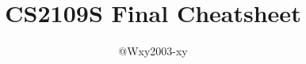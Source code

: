 \documentclass[8pt,twocolumn]{article}
\begin{document}
\makeatletter
\renewcommand\maketitle{%
  \twocolumn[%
    \begin{center}
      \begin{minipage}{0.6\textwidth}  %
        \centering
        {\LARGE\bfseries\@title\par}
        {\large\@author\par}
        \vspace{1em}
      \end{minipage}
    \end{center}
  ]
}
\makeatother

\title{CS2109S Final Cheatsheet}
\author{@Wxy2003-xy}
\date{}
\end{document}
